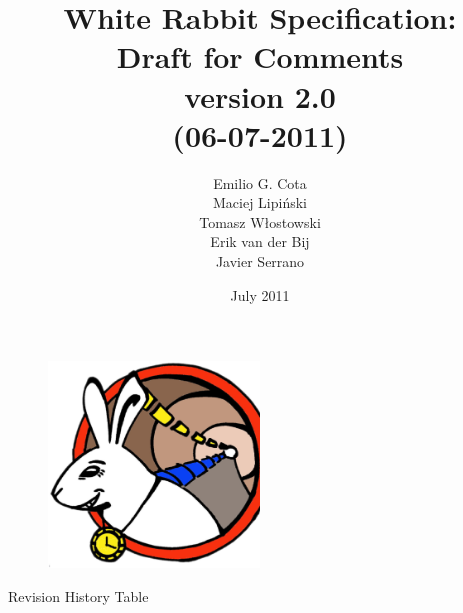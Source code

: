 \documentclass[a4paper, 12pt]{article}
\begin{document}
\title{White Rabbit Specification: \\Draft for Comments\\\normalsize {version 2.0}\\\small{(06-07-2011)}}
\author{Emilio G. Cota\\Maciej Lipi\'{n}ski\\Tomasz W\l{}ostowski\\Erik van der Bij\\Javier Serrano}
\date{July 2011}
\maketitle
\thispagestyle{empty}

\begin{figure}[ht!]
  \centering
  \vspace{1.3cm}
  \includegraphics[width=0.50\textwidth]{../../../figures/logo/WRlogo.ps}
  \label{fig:wr_logo}
\end{figure}




\newpage

\setcounter{page}{1}
\begin{center}
\large Revision History Table 
\end{center} 
\end{document}
